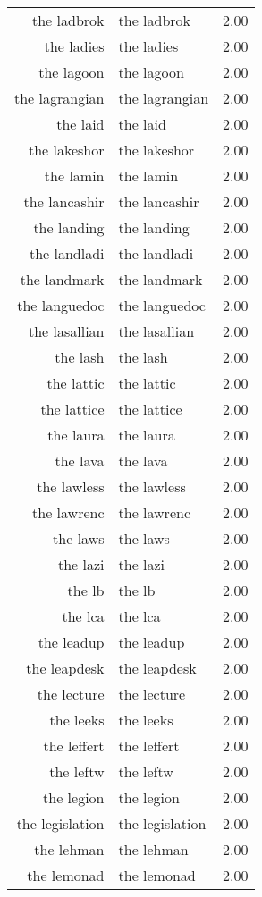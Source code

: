 \begin{table}[ht]
\begin{tabular}{rlr}
  the ladbrok & the ladbrok & 2.00 \\ 
  the ladies & the ladies & 2.00 \\ 
  the lagoon & the lagoon & 2.00 \\ 
  the lagrangian & the lagrangian & 2.00 \\ 
  the laid & the laid & 2.00 \\ 
  the lakeshor & the lakeshor & 2.00 \\ 
  the lamin & the lamin & 2.00 \\ 
  the lancashir & the lancashir & 2.00 \\ 
  the landing & the landing & 2.00 \\ 
  the landladi & the landladi & 2.00 \\ 
  the landmark & the landmark & 2.00 \\ 
  the languedoc & the languedoc & 2.00 \\ 
  the lasallian & the lasallian & 2.00 \\ 
  the lash & the lash & 2.00 \\ 
  the lattic & the lattic & 2.00 \\ 
  the lattice & the lattice & 2.00 \\ 
  the laura & the laura & 2.00 \\ 
  the lava & the lava & 2.00 \\ 
  the lawless & the lawless & 2.00 \\ 
  the lawrenc & the lawrenc & 2.00 \\ 
  the laws & the laws & 2.00 \\ 
  the lazi & the lazi & 2.00 \\ 
  the lb & the lb & 2.00 \\ 
  the lca & the lca & 2.00 \\ 
  the leadup & the leadup & 2.00 \\ 
  the leapdesk & the leapdesk & 2.00 \\ 
  the lecture & the lecture & 2.00 \\ 
  the leeks & the leeks & 2.00 \\ 
  the leffert & the leffert & 2.00 \\ 
  the leftw & the leftw & 2.00 \\ 
  the legion & the legion & 2.00 \\ 
  the legislation & the legislation & 2.00 \\ 
  the lehman & the lehman & 2.00 \\ 
  the lemonad & the lemonad & 2.00 \\ 

\end{tabular}
\end{table}
